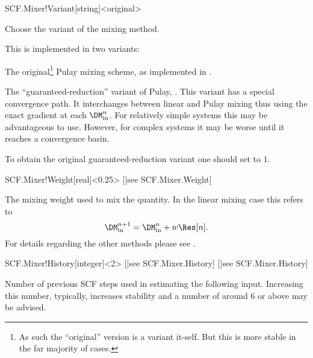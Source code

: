 \begin{fdfentry}{SCF.Mixer!Variant}[string]<original>

  Choose the variant of the mixing method.

  \begin{fdfoptions}

    \option[Pulay] %
    This is implemented in two variants:
    \begin{fdfoptions}

      The original\footnote{As such the ``original'' version is a
          variant it-self. But this is more stable in the far majority
          of cases.} Pulay mixing scheme, as implemented in
      \cite{Kresse1996}.
      
      \option[GR] %
      The ``guaranteed-reduction'' variant of Pulay,
      \cite{Bowler2000}. This variant has a special convergence
      path. It interchanges between linear and Pulay mixing thus using
      the exact gradient at each $\DM^n_{\mathrm{in}}$.
      For relatively simple systems this may be advantageous to
      use. However, for complex systems it may be worse until it
      reaches a convergence basin.

      To obtain the original guaranteed-reduction variant one should
      set  to $1$.

    \end{fdfoptions}

  \end{fdfoptions}

\end{fdfentry}

\begin{fdfentry}{SCF.Mixer!Weight}[real]<0.25>%
  [|see SCF.Mixer.Weight]

  The mixing weight used to mix the quantity.
  In the linear mixing case this refers to
  \begin{equation}
    \DM^{n+1}_{\mathrm{in}} = \DM^n_{\mathrm{in}} + w \Res[n].
  \end{equation}
  For details regarding the other methods please see .

\end{fdfentry}


\begin{fdfentry}{SCF.Mixer!History}[integer]<2>%
  [|see SCF.Mixer.History]%
  [|see SCF.Mixer.History]

  Number of previous SCF steps used in estimating the following input.
  Increasing this number, typically, increases stability and a number
  of around 6 or above may be advised.
  
\end{fdfentry}



